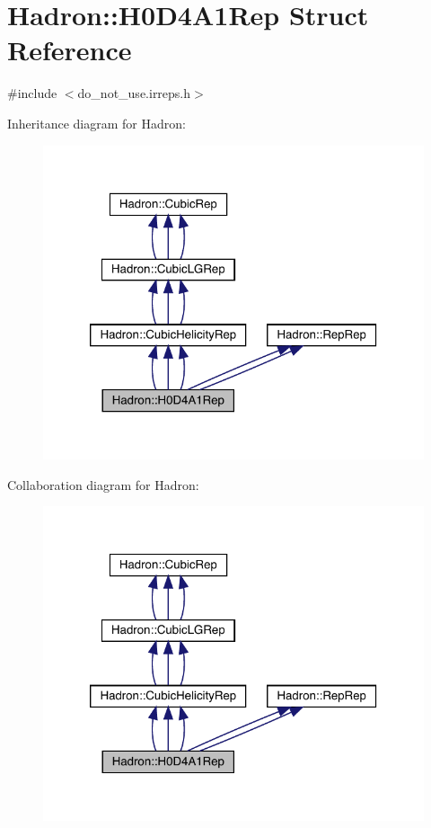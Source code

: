\hypertarget{structHadron_1_1H0D4A1Rep}{}\section{Hadron\+:\+:H0\+D4\+A1\+Rep Struct Reference}
\label{structHadron_1_1H0D4A1Rep}


{\ttfamily \#include $<$do\+\_\+not\+\_\+use.\+irreps.\+h$>$}



Inheritance diagram for Hadron\+:
\nopagebreak
\begin{figure}[H]
\begin{center}
\leavevmode
\includegraphics[width=320pt]{da/db6/structHadron_1_1H0D4A1Rep__inherit__graph}
\end{center}
\end{figure}


Collaboration diagram for Hadron\+:
\nopagebreak
\begin{figure}[H]
\begin{center}
\leavevmode
\includegraphics[width=320pt]{dd/da1/structHadron_1_1H0D4A1Rep__coll__graph}
\end{center}
\end{figure}
